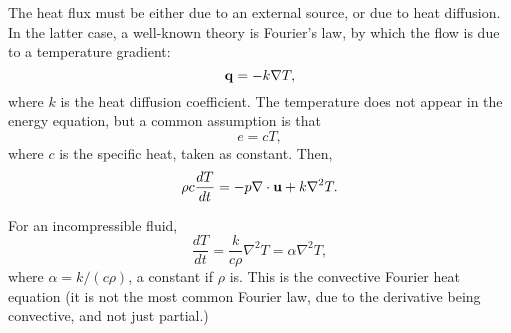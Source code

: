 The heat flux must be either due to an external source, or due to heat
diffusion. In the latter case, a well-known theory is Fourier's law, by
which the flow is due to a temperature gradient:
\[
\mathbf{q}=- k \nabla T ,
\]
where $k$ is the heat diffusion coefficient. The temperature does not
appear in the energy equation, but a common assumption is that
\[
e = c T ,
\]
where $c$ is the specific heat, taken as constant. Then,
\[
\rho  c \frac{d T }{dt}  = - p \nabla\cdot \mathbf{u}  + k \nabla^2 T .
\]

For an incompressible fluid,
\[
 \frac{d T }{dt}  = \frac{ k }{ c \rho} \nabla^2 T  = \alpha \nabla^2 T ,
\]
where $\alpha = k / (c \rho)$, a constant if $\rho$ is. This is the
convective Fourier heat equation (it is not the most common Fourier
law, due to the derivative being convective, and not just partial.)

